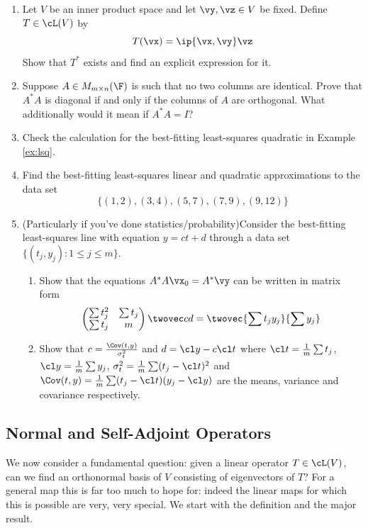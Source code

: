 \begin{exercises}
\begin{enumerate}[label=\thesubsection.\arabic*., align=right]
  \item Let $V$ be an inner product space and let $\vy,\vz\in V$ be fixed. Define $T\in\cL(V)$ by
  \[T(\vx)=\ip{\vx,\vy}\vz\]
  Show that $T^*$ exists and find an explicit expression for it.
  
  \item Suppose $A\in M_{m\times n}(\F)$ is such that no two columns are identical. Prove that $A^*A$ is diagonal if and only if the columns of $A$ are orthogonal. What additionally would it mean if $A^*A=I$?
  
  \item Check the calculation for the best-fitting least-squares quadratic in Example \ref{ex:lsq}.
  
  \item Find the best-fitting least-squares linear and quadratic approximations to the data set
  \[\{(1,2),(3,4),(5,7),(7,9),(9,12)\}\]
  
  \item (Particularly if you've done statistics/probability)\quad  Consider the best-fitting least-squares line with equation $y=ct+d$ through a data set $\{(t_j,y_j):1\le j\le m\}$.
  \begin{enumerate}
    \item Show that the equations $A^*A\vx_0=A^*\vy$ can be written in matrix form
    \[\begin{pmatrix}
    \sum t^2_j&\sum t_j\\
    \sum t_j&m
    \end{pmatrix}\twovec cd =\twovec{\sum t_jy_j}{\sum y_j}\]
    \item Show that $c=\frac{\Cov(t,y)}{\sigma^2_t}$ and $d=\cl y-c\cl t$ where $\cl t=\frac 1m\sum t_j$, $\cl y=\frac 1m\sum y_j$, $\sigma^2_t=\frac 1m\sum(t_j-\cl t)^2$ and $\Cov(t,y)=\frac 1m\sum(t_j-\cl t)(y_j-\cl y)$ are the means, variance and covariance respectively.
	\end{enumerate}
\end{enumerate}
\end{exercises}


\subsection{Normal and Self-Adjoint Operators}

We now consider a fundamental question: given a linear operator $T\in\cL(V)$, can we find an orthonormal basis of $V$ consisting of eigenvectors of $T$? For a general map this is far too much to hope for: indeed the linear maps for which this is possible are very, very special. We start with the definition and the major result.

